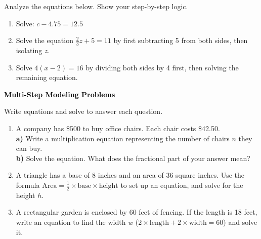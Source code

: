 \documentclass[12pt, letterpaper, fleqn]{article}
\newcommand{\blanklong}{\underline{\hspace{6.5cm}}}
\begin{document}
\noindent
Analyze the equations below. Show your step-by-step logic.

\vspace{3mm}

\begin{enumerate}[itemsep=2.2cm, leftmargin=0.6cm]

\item Solve: $c - 4.75 = 12.5$

\vspace{2cm}

\item Solve the equation $\frac{2}{3}z + 5 = 11$ by first subtracting 5 from both sides, then isolating $z$.

\vspace{2cm}

\item Solve $4(x - 2) = 16$ by dividing both sides by 4 first, then solving the remaining equation.

\vspace{2cm}

\end{enumerate}

\newpage

\begin{tcolorbox}[colback=black!10]
\large\textcolor{black}{\textbf{Multi-Step Modeling Problems}}
\end{tcolorbox}

\noindent
Write equations and solve to answer each question.

\vspace{3mm}

\begin{enumerate}[itemsep=2.2cm, leftmargin=0.6cm]

\item A company has \$500 to buy office chairs. Each chair costs \$42.50. \\
\textbf{a)} Write a multiplication equation representing the number of chairs $n$ they can buy. \blanklong \\
\textbf{b)} Solve the equation. What does the fractional part of your answer mean?

\vspace{2cm}

\item A triangle has a base of 8 inches and an area of 36 square inches. Use the formula $\text{Area} = \frac{1}{2} \times \text{base} \times \text{height}$ to set up an equation, and solve for the height $h$.

\vspace{2cm}

\item A rectangular garden is enclosed by 60 feet of fencing. If the length is 18 feet, write an equation to find the width $w$ ($2 \times \text{length} + 2 \times \text{width} = 60$) and solve it.

\vspace{2cm}

\end{enumerate}
\end{document}
